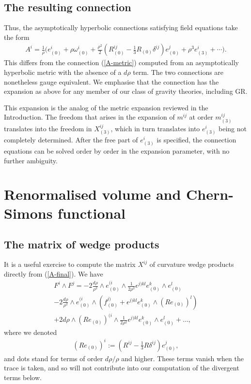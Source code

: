 \documentclass[a4paper,12pt]{article}
\newcommand{\be}{\begin{eqnarray}}
\newcommand{\ee}{\end{eqnarray}}
\begin{document}
\subsection{The resulting connection}

Thus, the asymptotically hyperbolic connections satisfying field equations take the form
\be\label{A-final}
A^i=\frac{1}{\rho}\Big(e_{(0)}^i+\rho \omega_{(0)}^i+\frac{\rho^2}{2} \left( R^{ij}_{(0)} - \frac{1}{3} R_{(0)} \delta^{ij}\right) e_{(0)}^j+\rho^3 e_{(3)}^i+\cdots\Big).
\ee
This differs from the connection (\ref{A-metric}) computed from an asymptotically hyperbolic metric with the absence of a $d\rho$ term. The two connections are nonetheless gauge equivalent. We emphasise that the connection has the expansion as above for any member of our class of gravity theories, including GR. 

This expansion is the analog of the metric expansion reviewed in the Introduction. The freedom that arises in the expansion of $m^{ij}$ at order $m_{(3)}^{ij}$ translates into the freedom in $X_{(3)}^{ij}$, which in turn translates into $e_{(3)}^i$ being not completely determined. After the free part of $e_{(3)}^i$ is specified, the connection equations can be solved order by order in the expansion parameter, with no further ambiguity. 

\section{Renormalised volume and Chern-Simons functional}
\label{sec:renorm}

\subsection{The matrix of wedge products}

It is a useful exercise to compute the matrix $X^{ij}$ of curvature wedge products directly from (\ref{A-final}). We have
\begin{multline}\label{X-soln}
F^i\wedge F^j = - 2\frac{d\rho}{\rho^2} \wedge e_{(0)}^{(i} \wedge \frac{1}{2\rho^2} \epsilon^{j)kl} e_{(0)}^k \wedge e_{(0)}^l \\ %
-2\frac{d\rho}{\rho^2} \wedge e_{(0)}^{(i} \wedge ( f^{j)}_{(0)} + \epsilon^{j)kl} e_{(0)}^k \wedge(Re_{(0)})^l )\\ + 2d\rho \wedge(R e_{(0)})^{(i} \wedge \frac{1}{2\rho^2} \epsilon^{j)kl} e_{(0)}^k \wedge e_{(0)}^l + \ldots,
\end{multline}
where we denoted 
\be
(Re_{(0)})^i:= \left( R^{ij} - \frac{1}{3} R \delta^{ij}\right) e_{(0)}^j,
\ee
and dots stand for terms of order $d\rho/\rho$ and higher. These terms vanish when the trace is taken, and so will not contribute into our computation of the divergent terms below.
\end{document}

